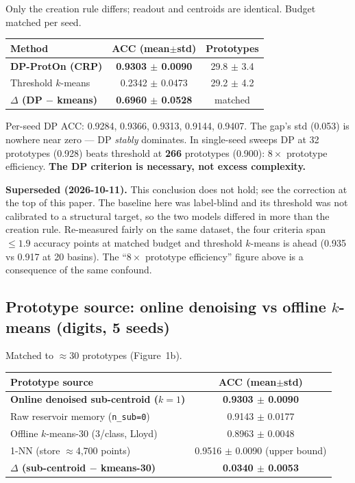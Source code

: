 \documentclass[11pt,a4paper]{article}
\begin{document}
Only the creation rule differs; readout and centroids are identical. Budget matched per seed.

\begin{table}[H]
\centering
\begin{tabular}{@{}lcc@{}}
\toprule
Method & ACC (mean$\pm$std) & Prototypes \\
\midrule
\textbf{DP-ProtOn (CRP)} & \textbf{0.9303 $\pm$ 0.0090} & 29.8 $\pm$ 3.4 \\
Threshold $k$-means & 0.2342 $\pm$ 0.0473 & 29.2 $\pm$ 4.2 \\
\textbf{$\Delta$ (DP $-$ kmeans)} & \textbf{0.6960 $\pm$ 0.0528} & matched \\
\bottomrule
\end{tabular}
\end{table}

Per-seed DP ACC: 0.9284, 0.9366, 0.9313, 0.9144, 0.9407. The gap's std (0.053) is nowhere near zero — DP \textit{stably} dominates. In single-seed sweeps DP at 32 prototypes (0.928) beats threshold at \textbf{266} prototypes (0.900): $8\times$ prototype efficiency. \textbf{The DP criterion is necessary, not excess complexity.}

\noindent\textbf{\color{red!70!black}Superseded (2026-10-11).} This conclusion does not hold; see the correction at the top of this paper. The baseline here was label-blind and its threshold was not calibrated to a structural target, so the two models differed in more than the creation rule. Re-measured fairly on the same dataset, the four criteria span $\le 1.9$ accuracy points at matched budget and threshold $k$-means is ahead (0.935 vs 0.917 at 20 basins). The ``$8\times$ prototype efficiency'' figure above is a consequence of the same confound.

\subsection{Prototype source: online denoising vs offline $k$-means (digits, 5 seeds)}

Matched to $\approx$30 prototypes (Figure~1b).

\begin{table}[H]
\centering
\begin{tabular}{@{}lc@{}}
\toprule
Prototype source & ACC (mean$\pm$std) \\
\midrule
\textbf{Online denoised sub-centroid ($k{=}1$)} & \textbf{0.9303 $\pm$ 0.0090} \\
Raw reservoir memory (\texttt{n\_sub=0}) & 0.9143 $\pm$ 0.0177 \\
Offline $k$-means-30 (3/class, Lloyd) & 0.8963 $\pm$ 0.0048 \\
1-NN (store $\approx$4,700 points) & 0.9516 $\pm$ 0.0090 (upper bound) \\
\textbf{$\Delta$ (sub-centroid $-$ kmeans-30)} & \textbf{0.0340 $\pm$ 0.0053} \\
\bottomrule
\end{tabular}
\end{table}
\end{document}

